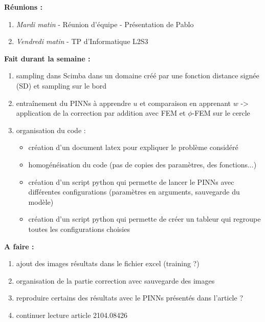\textbf{Réunions :}
\begin{enumerate}[label=\textbullet]
	\item \textit{Mardi matin} -  Réunion d'équipe - Présentation de Pablo
	\item \textit{Vendredi matin} - TP d'Informatique L2S3
\end{enumerate}
\textbf{Fait durant la semaine :}
\begin{enumerate}[label=\textbullet]
	\item sampling dans Scimba dans un domaine créé par une fonction distance signée (SD) et sampling sur le bord
	\item entraînement du PINNs à apprendre $u$ et comparaison en apprenant $w$ -> application de la correction par addition avec FEM et $\phi$-FEM sur le cercle
	\item organisation du code :
	\begin{itemize}
		\item création d'un document latex pour expliquer le problème considéré
		\item homogénéisation du code (pas de copies des paramètres, des fonctions...)
		\item création d'un script python qui permette de lancer le PINNs avec différentes configurations (paramètres en arguments, sauvegarde du modèle)
		\item création d'un script python qui permette de créer un tableur qui regroupe toutes les configurations choisies
	\end{itemize} 
\end{enumerate}

\textbf{A faire :}
\begin{enumerate}[label=\textbullet]
	\item ajout des images résultats dans le fichier excel (training ?)
	\item organisation de la partie correction avec sauvegarde des images
	\item reproduire certains des résultats avec le PINNs présentés dans l'article ?
	\item continuer lecture article 2104.08426
\end{enumerate}
